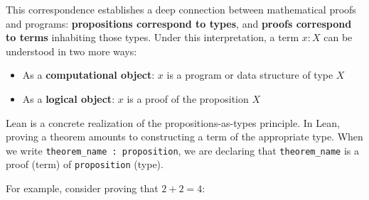 This correspondence establishes a deep connection between mathematical proofs and programs: 
\textbf{propositions correspond to types}, and \textbf{proofs correspond to terms} inhabiting those types. 
Under this interpretation, a term $x : X$ can be understood in two more ways:
\begin{itemize}
    \item As a \textbf{computational object}: $x$ is a program or data structure of type $X$
    \item As a \textbf{logical object}: $x$ is a proof of the proposition $X$
\end{itemize}
Lean is a concrete realization of the propositions-as-types principle.
In Lean, proving a theorem amounts to constructing a term of the appropriate type. 
When we write \lstinline[language=lean]|theorem_name : proposition|, we are declaring that 
\lstinline[language=lean]|theorem_name| is a proof (term) of \lstinline[language=lean]|proposition| (type). 

For example, consider proving that $2 + 2 = 4$:

